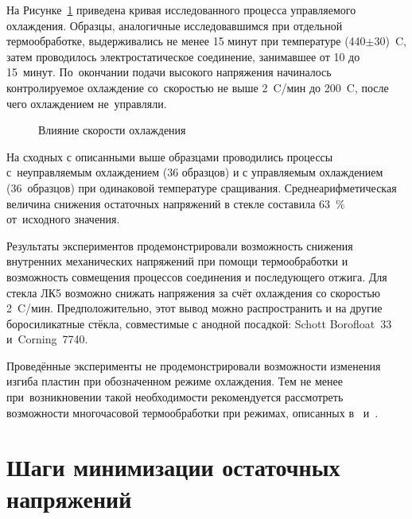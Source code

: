 На Рисунке~\ref{fig:cooling_control_temp} приведена кривая исследованного
процесса управляемого охлаждения. Образцы, аналогичные исследовавшимся при
отдельной термообработке, выдерживались не менее 15 минут при температуре
(440$\pm$30)~{\textdegree}C, затем проводилось электростатическое соединение,
занимавшее от 10 до 15~минут. По~окончании подачи высокого напряжения начиналось
контролируемое охлаждение со~скоростью не выше 2~{\textdegree}C/мин до
200~{\textdegree}C, после чего охлаждением не~управляли.

\begin{figure}[!htb]
    \centering%
    \noindent%
    \par%
    \noindent%
    \par%

    \caption{Влияние скорости охлаждения}
    \label{fig:cooling_control_temp}
\end{figure}

На сходных с описанными выше образцами проводились процессы с~неуправляемым
охлаждением (36 образцов) и с управляемым охлаждением (36~образцов) при
одинаковой температуре сращивания.
Среднеарифметическая величина снижения остаточных напряжений в стекле составила
63~\% от~исходного значения.

Результаты экспериментов продемонстрировали возможность снижения внутренних
механических напряжений при помощи термообработки и возможность совмещения
процессов соединения и последующего отжига. Для стекла ЛК5 возможно снижать
напряжения за счёт охлаждения со скоростью 2~{\textdegree}C/мин.
Предположительно, этот вывод можно распространить и на другие боросиликатные
стёкла, совместимые с анодной посадкой: Schott Borofloat~33 и~Corning~7740.

Проведённые эксперименты не продемонстрировали возможности изменения изгиба
пластин при обозначенном режиме охлаждения. Тем не менее при~возникновении такой
необходимости рекомендуется рассмотреть возможности многочасовой термообработки
при режимах, описанных в~\cite{Kim2015warpage}
и~\cite{Harz1996Curvature_changing}.

\section{Шаги минимизации остаточных напряжений}\label{metod_minim_ost_napr}

